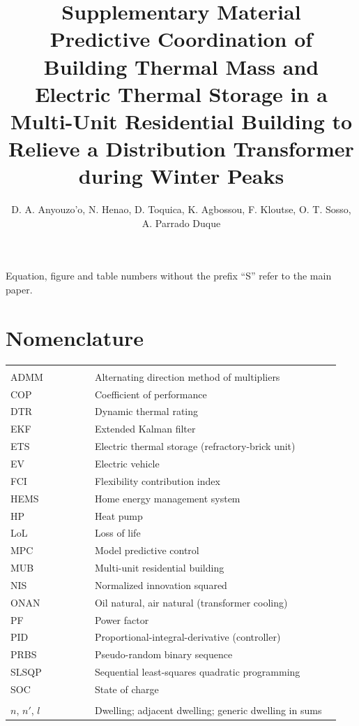 \documentclass[10pt,letterpaper]{article}
\title{\textbf{Supplementary Material}\\[2pt]\large Predictive Coordination of Building Thermal Mass and Electric Thermal Storage in a Multi-Unit Residential Building to Relieve a Distribution Transformer during Winter Peaks}
\author{D. A. Anyouzo'o, N. Henao, D. Toquica, K. Agbossou, F. Kloutse, O. T. Sosso, A. Parrado Duque}
\date{}
\begin{document}
\maketitle
\noindent Equation, figure and table numbers without the prefix ``S'' refer to the main paper.

\section{Nomenclature}\label{s:nom}
{\small
\begin{longtable}{@{}>{\raggedright\arraybackslash}p{0.24\linewidth}>{\raggedright\arraybackslash}p{0.70\linewidth}@{}}
\multicolumn{2}{@{}l}{\textbf{Acronyms}}\\
ADMM & Alternating direction method of multipliers \\
COP & Coefficient of performance \\
DTR & Dynamic thermal rating \\
EKF & Extended Kalman filter \\
ETS & Electric thermal storage (refractory-brick unit) \\
EV & Electric vehicle \\
FCI & Flexibility contribution index \\
HEMS & Home energy management system \\
HP & Heat pump \\
LoL & Loss of life \\
MPC & Model predictive control \\
MUB & Multi-unit residential building \\
NIS & Normalized innovation squared \\
ONAN & Oil natural, air natural (transformer cooling) \\
PF & Power factor \\
PID & Proportional-integral-derivative (controller) \\
PRBS & Pseudo-random binary sequence \\
SLSQP & Sequential least-squares quadratic programming \\
SOC & State of charge \\[4pt]
\multicolumn{2}{@{}l}{\textbf{Indices}}\\
$n$, $n'$, $l$ & Dwelling; adjacent dwelling; generic dwelling in sums \\

\end{longtable}}
\end{document}
